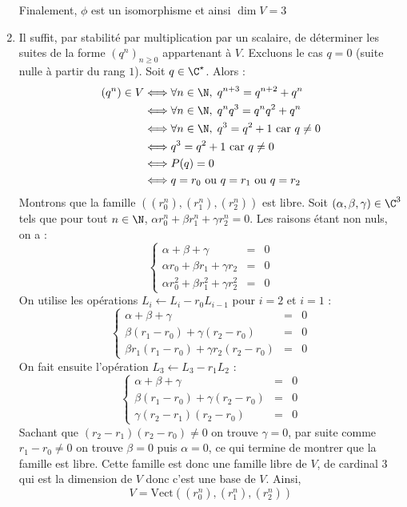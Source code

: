 \documentclass[a4paper,10pt]{report}
\begin{document}
\begin{enumerate}
\noindent Finalement, $\phi$ est un isomorphisme et ainsi $\dim V=3$
 \item Il suffit, par stabilité par multiplication par un scalaire, de déterminer les suites de la forme $(q^n)_{n \geq 0}$ appartenant à $V$. Excluons le cas $q=0$ (suite nulle à partir du rang $1$). Soit $q\in\C^\star$. Alors :
 \begin{align*}
(q^n)\in V & \Longleftrightarrow \forall n\in\N, \; q^{n+3}=q^{n+2}+q^n \\
&\Longleftrightarrow \forall n\in\N, \; q^n q^3=q^{n}q^{2}+q^n \\
&\Longleftrightarrow \forall n\in\N, \; q^3=q^{2}+1 \hbox{ car } q \neq 0 \\
&\Longleftrightarrow  q^3=q^{2}+1 \hbox{ car } q \neq 0 \\
&\Longleftrightarrow P(q)=0 \\
&\Longleftrightarrow q= r_0 \hbox{ ou } q=r_1 \hbox{ ou } q=r_2
\end{align*}
Montrons que la famille $((r_0^n),(r_1^n),(r_2^n))$ est libre. Soit $(\alpha,\beta,\gamma)\in\C^3$ tels que pour tout $n\in\N$, $\alpha r_0^n+\beta r_1^n+\gamma r_2^n=0$. Les raisons étant non nuls, on a :
$$\left\lbrace\begin{array}{rcl} \alpha+\beta+\gamma&=&0 \\ \alpha r_0+\beta r_1+\gamma r_2&=&0 \\\alpha r_0^2+\beta r_1^2+\gamma r_2^2&=&0\end{array}  \right.$$
On utilise les opérations $L_i\leftarrow L_i-r_0L_{i-1}$ pour $i=2$ et $i=1$ :
$$\left\lbrace\begin{array}{rcl} \alpha+\beta+\gamma&=&0 \\ \beta (r_1-r_0)+\gamma (r_2-r_0)&=&0 \\  \beta r_1(r_1-r_0)+\gamma r_2(r_2-r_0) &=&0\end{array}  \right.$$
On fait ensuite l'opération $L_3\leftarrow L_3-r_1L_2$ : 
$$\left\lbrace\begin{array}{rcl} \alpha+\beta+\gamma&=&0 \\ \beta (r_1-r_0)+\gamma (r_2-r_0)&=&0 \\  \gamma (r_2-r_1)(r_2-r_0) &=&0\end{array}  \right.$$ 
Sachant que $(r_2-r_1)(r_2-r_0)\neq0$ on trouve $\gamma=0$, par suite comme $r_1-r_0\neq 0$ on trouve $\beta=0$ puis $\alpha=0$, ce qui termine de montrer que la famille est libre. Cette famille est donc une famille libre de $V$, de cardinal $3$ qui est la dimension de $V$ donc c'est une base de $V$. Ainsi,
$$V=\textrm{Vect}((r_0^n),(r_1^n),(r_2^n))$$


\end{enumerate}
\end{document}
